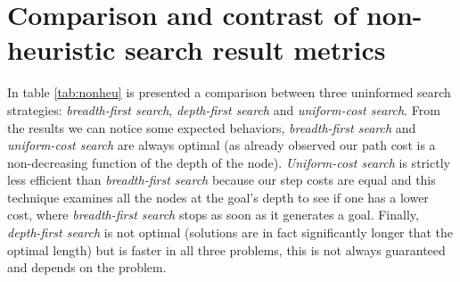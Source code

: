 \documentclass[10pt,a4paper]{article}
\begin{document}
\section{Comparison and contrast of non-heuristic search result metrics}

\begin{table}
\caption{Comparison and contrast of non-heuristic search result metrics.}\label{tab:nonheu}
\end{table}

In table \ref{tab:nonheu} is presented a comparison between three uninformed search strategies: \textit{breadth-first search}, \textit{depth-first search} and \textit{uniform-cost search}. From the results we can notice some expected behaviors, \textit{breadth-first search} and  \textit{uniform-cost search} are always optimal (as already observed our path cost is a non-decreasing function of the depth of the node). \textit{Uniform-cost search} is strictly less efficient than \textit{breadth-first search} because our step costs are equal and this technique examines all the nodes at the goal's depth to see if one has a lower cost, where \textit{breadth-first search} stops as soon as it generates a goal. Finally,  \textit{depth-first search} is not optimal (solutions are in fact significantly longer that the optimal length) but is faster in all three problems, this is not always guaranteed and depends on the problem.
\end{document}
